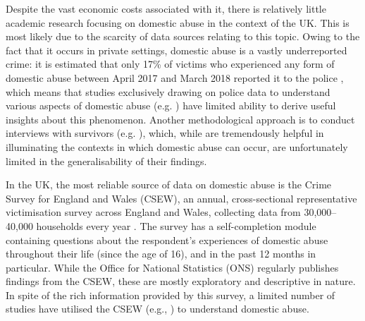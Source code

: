 \documentclass[11pt, a4paper]{article}
\begin{document}
Despite the vast economic costs associated with it, there is relatively little academic research focusing on domestic abuse in the context of the UK. This is most likely due to the scarcity of data sources relating to this topic. Owing to the fact that it occurs in private settings, domestic abuse is a vastly underreported crime: it is estimated that only 17\% of victims who experienced any form of domestic abuse between April 2017 and March 2018 reported it to the police \cite{ONS}, which means that studies exclusively drawing on police data to understand various aspects of domestic abuse (e.g. ) have limited ability to derive useful insights about this phenomenon. Another methodological approach is to conduct interviews with survivors (e.g. ), which, while are tremendously helpful in illuminating the contexts in which domestic abuse can occur, are unfortunately limited in the generalisability of their findings.

In the UK, the most reliable source of data on domestic abuse is the Crime Survey for England and Wales (CSEW), an annual, cross-sectional representative victimisation survey across England and Wales, collecting data from 30,000--40,000 households every year \cite{OfficeforNationalStatistics2019}. The survey has a self-completion module containing questions about the respondent's experiences of domestic abuse throughout their life (since the age of 16), and in the past 12 months in particular.  While the Office for National Statistics (ONS) regularly publishes findings from the CSEW, these are mostly exploratory and descriptive in nature. In spite of the rich information provided by this survey, a limited number of studies have utilised the CSEW (e.g., ) to understand domestic abuse. 
 
\end{document}
